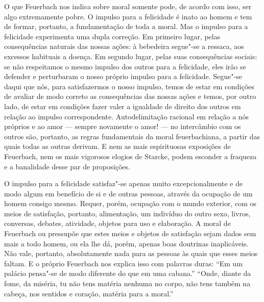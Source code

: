 O
que Feuerbach nos
indica sobre moral somente pode, de acordo com isso, ser algo
extremamente pobre. O impulso para a felicidade é inato ao homem e tem
de formar, portanto, a fundamentação de toda a moral. Mas o impulso para
a felicidade experimenta uma dupla correção.
Em primeiro lugar, pelas consequências naturais das nossas ações: à
bebedeira segue"-se a ressaca, aos excessos habituais a doença. Em
segundo lugar, pelas suas consequências sociais: se não respeitamos o
mesmo impulso dos outros para a felicidade, eles irão se defender e
perturbaram o nosso próprio impulso para a felicidade. Segue"-se daqui %
que nós, para satisfazermos o nosso impulso, temos de estar em condições
de avaliar de modo correto as consequências das nossas ações e temos,
por outro lado, de estar em condições fazer valer a igualdade de direito
dos outros em relação ao impulso correspondente. Autodelimitação
racional em relação a nós próprios e ao amor --- sempre novamente o amor!
--- no intercâmbio com os outros são, portanto, as regras fundamentais da %
moral feuerbachiana, a partir das quais todas as outras derivam. E nem
as mais espirituosas exposições
de Feuerbach,
nem os mais vigorosos elogios de Starcke, podem esconder a fraqueza e a
banalidade desse par de proposições.

O impulso para a felicidade satisfaz"-se apenas muito excepcionalmente e
de modo algum em benefício de si e de outras pessoas, através da
ocupação de um homem consigo mesmo. Requer, porém, ocupação com o mundo
exterior, com os meios de satisfação, portanto, alimentação, um
indivíduo do outro sexo, livros, conversas, debates, atividade, objetos
para uso e elaboração. A moral
de Feuerbach ou
pressupõe que estes meios e objetos de satisfação sejam dados sem mais a
todo homem, ou ela lhe dá, porém, apenas boas doutrinas inaplicáveis.
Não vale, portanto, absolutamente nada para as pessoas às quais que esses
meios faltam. E o
próprio Feuerbach nos
explica isso com palavras duras: ``Em um palácio pensa"-se de modo
diferente do que em uma cabana.'' ``Onde, diante da fome, da miséria, tu
não tens matéria nenhuma no corpo, não tens também na cabeça, nos
sentidos e coração, matéria para a moral.''


